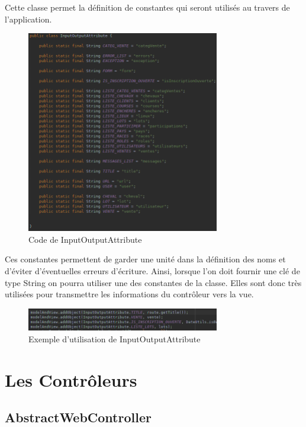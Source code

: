 		Cette classe permet la définition de constantes qui seront utilisés au travers de l'application.

		\begin{figure}[H]
			\centering\includegraphics[width=0.75\textwidth, keepaspectratio]{res/InputOutputAttribute.png}
			\caption{Code de InputOutputAttribute}
		\end{figure}

		Ces constantes permettent de garder une unité dans la définition des noms et d'éviter d'éventuelles erreurs d'écriture. Ainsi, lorsque l'on doit fournir une clé de type String on pourra utiliser une des constantes de la classe. Elles sont donc très utilisées pour transmettre les informations du contrôleur vers la vue.

		\begin{figure}[H]
			\centering\includegraphics[width=0.75\textwidth, keepaspectratio]{res/InputOutputAttribute-controller.png}
			\caption{Exemple d'utilisation de InputOutputAttribute}
		\end{figure}

	\section{Les Contrôleurs}

		\subsection{AbstractWebController}

